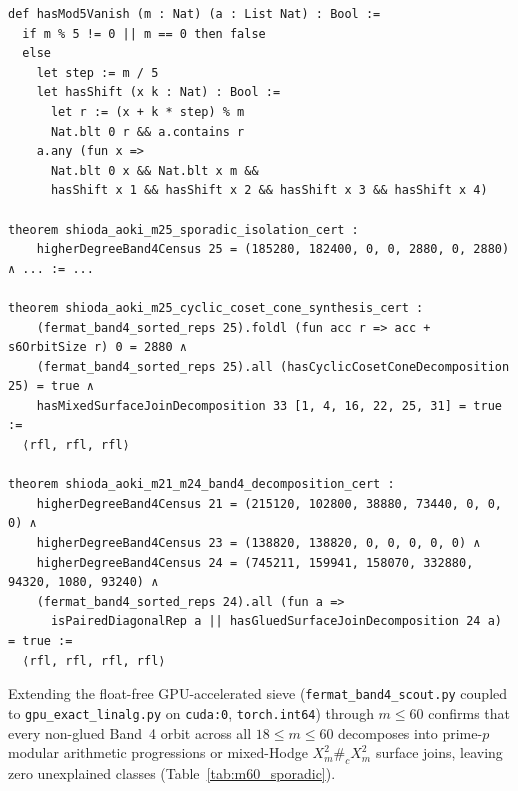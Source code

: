 \documentclass[11pt,a4paper]{article}
\begin{document}
\begin{lstlisting}[caption={Modular $5$-term vanishing predicate and $m = 25$ isolation theorem in \texttt{FermatHighDegreeExt.lean}.}]
def hasMod5Vanish (m : Nat) (a : List Nat) : Bool :=
  if m % 5 != 0 || m == 0 then false
  else
    let step := m / 5
    let hasShift (x k : Nat) : Bool :=
      let r := (x + k * step) % m
      Nat.blt 0 r && a.contains r
    a.any (fun x =>
      Nat.blt 0 x && Nat.blt x m &&
      hasShift x 1 && hasShift x 2 && hasShift x 3 && hasShift x 4)

theorem shioda_aoki_m25_sporadic_isolation_cert :
    higherDegreeBand4Census 25 = (185280, 182400, 0, 0, 2880, 0, 2880) ∧ ... := ...

theorem shioda_aoki_m25_cyclic_coset_cone_synthesis_cert :
    (fermat_band4_sorted_reps 25).foldl (fun acc r => acc + s6OrbitSize r) 0 = 2880 ∧
    (fermat_band4_sorted_reps 25).all (hasCyclicCosetConeDecomposition 25) = true ∧
    hasMixedSurfaceJoinDecomposition 33 [1, 4, 16, 22, 25, 31] = true :=
  ⟨rfl, rfl, rfl⟩

theorem shioda_aoki_m21_m24_band4_decomposition_cert :
    higherDegreeBand4Census 21 = (215120, 102800, 38880, 73440, 0, 0, 0) ∧
    higherDegreeBand4Census 23 = (138820, 138820, 0, 0, 0, 0, 0) ∧
    higherDegreeBand4Census 24 = (745211, 159941, 158070, 332880, 94320, 1080, 93240) ∧
    (fermat_band4_sorted_reps 24).all (fun a =>
      isPairedDiagonalRep a || hasGluedSurfaceJoinDecomposition 24 a) = true :=
  ⟨rfl, rfl, rfl, rfl⟩
\end{lstlisting}

Extending the float-free GPU-accelerated sieve (\texttt{fermat\_band4\_scout.py} coupled to \texttt{gpu\_exact\_linalg.py} on \texttt{cuda:0}, \texttt{torch.int64}) through $m \le 60$ confirms that every non-glued Band~4 orbit across all $18 \le m \le 60$ decomposes into prime-$p$ modular arithmetic progressions or mixed-Hodge $X_m^2 \#_c X_m^2$ surface joins, leaving zero unexplained classes (Table~\ref{tab:m60_sporadic}).
\end{document}
